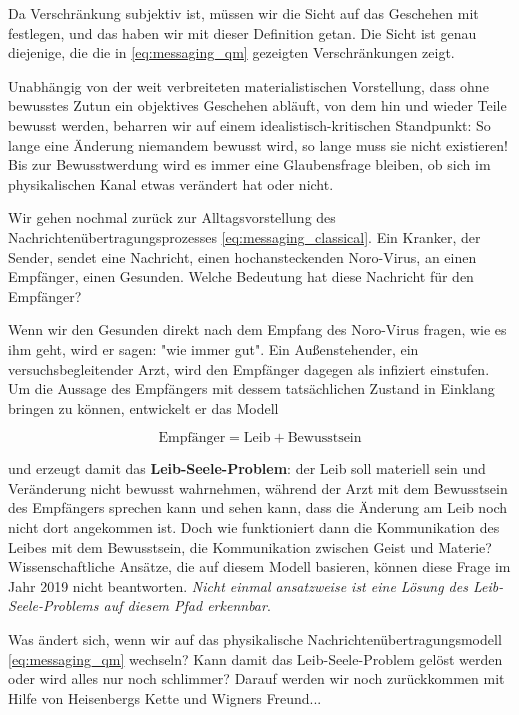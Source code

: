 \documentclass[12pt]{book}
\begin{document}
Da Verschränkung subjektiv ist, müssen wir die Sicht auf das Geschehen mit festlegen, und das haben wir mit dieser Definition getan. Die Sicht ist genau diejenige, die die in  \eqref{eq:messaging_qm} gezeigten Verschränkungen zeigt.

Unabhängig von der weit verbreiteten materialistischen Vorstellung, dass ohne bewusstes Zutun ein objektives Geschehen abläuft, von dem hin und wieder Teile bewusst werden, beharren wir auf einem idealistisch-kritischen Standpunkt: So lange eine Änderung niemandem bewusst wird, so lange muss sie nicht existieren! Bis zur Bewusstwerdung wird es immer eine Glaubensfrage bleiben, ob sich im physikalischen Kanal etwas verändert hat oder nicht. 

Wir gehen nochmal zurück zur Alltagsvorstellung des Nachrichtenübertragungsprozesses \eqref{eq:messaging_classical}. Ein Kranker, der Sender, sendet eine Nachricht, einen hochansteckenden Noro-Virus, an einen Empfänger, einen Gesunden. Welche Bedeutung hat diese Nachricht für den Empfänger?

Wenn wir den Gesunden direkt nach dem Empfang des Noro-Virus fragen, wie es ihm geht, wird er sagen: "wie immer gut". Ein Außenstehender, ein versuchsbegleitender Arzt, wird den Empfänger dagegen als infiziert einstufen. Um die Aussage des Empfängers mit dessem tatsächlichen Zustand in Einklang bringen zu können, entwickelt er das Modell

\begin{equation} 
\text{Empfänger} = \text{Leib} + \text{Bewusstsein}
\end{equation} 

und erzeugt damit das \textbf{Leib-Seele-Problem}: der Leib soll materiell sein und Veränderung nicht bewusst wahrnehmen, während der Arzt mit dem Bewusstsein des Empfängers sprechen kann und sehen kann, dass die Änderung am Leib noch nicht dort angekommen ist. Doch wie funktioniert dann die Kommunikation des Leibes mit dem Bewusstsein, die Kommunikation zwischen Geist und Materie? Wissenschaftliche Ansätze, die auf diesem Modell basieren, können diese Frage im Jahr 2019 nicht beantworten. \emph{Nicht einmal ansatzweise ist eine Lösung des Leib-Seele-Problems auf diesem Pfad erkennbar}.

Was ändert sich, wenn wir auf das physikalische Nachrichtenübertragungsmodell \eqref{eq:messaging_qm} wechseln? Kann damit das Leib-Seele-Problem gelöst werden oder wird alles nur noch schlimmer? Darauf werden wir noch zurückkommen mit Hilfe von Heisenbergs Kette und Wigners Freund...
\end{document}
